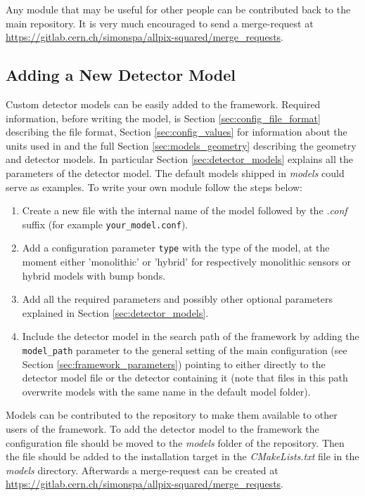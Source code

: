 Any module that may be useful for other people can be contributed back to the main repository. It is very much encouraged to send a merge-request at \url{https://gitlab.cern.ch/simonspa/allpix-squared/merge_requests}.

\subsection{Adding a New Detector Model}
\label{sec:adding_detector_model}
Custom detector models can be easily added to the framework. Required information, before writing the model, is Section \ref{sec:config_file_format} describing the file format, Section \ref{sec:config_values} for information about the units used in \apsq and the full Section \ref{sec:models_geometry} describing the geometry and detector models. In particular Section \ref{sec:detector_models} explains all the parameters of the detector model. The default models shipped in \textit{models} could serve as examples. To write your own module follow the steps below:
\begin{enumerate}
\item Create a new file with the internal name of the model followed by the \textit{.conf} suffix (for example \texttt{your\_model.conf}).
\item Add a configuration parameter \texttt{type} with the type of the model, at the moment either 'monolithic' or 'hybrid' for respectively monolithic sensors or hybrid models with bump bonds.
\item Add all the required parameters and possibly other optional parameters explained in Section \ref{sec:detector_models}.
\item Include the detector model in the search path of the framework by adding the \texttt{model\_path} parameter to the general setting of the main configuration (see Section \ref{sec:framework_parameters}) pointing to either directly to the detector model file or the detector containing it (note that files in this path overwrite models with the same name in the default model folder). 
\end{enumerate}

Models can be contributed to the repository to make them available to other users of the framework. To add the detector model to the framework the configuration file should be moved to the \textit{models} folder of the repository. Then the file should be added to the installation target in the \textit{CMakeLists.txt} file in the \textit{models} directory. Afterwards a merge-request can be created at \url{https://gitlab.cern.ch/simonspa/allpix-squared/merge_requests}.
